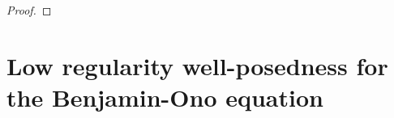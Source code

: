 \documentclass{amsart}
\theoremstyle{definition}
\begin{document}
\begin{proof}
%
%

\end{proof}

\section{Low regularity well-posedness for the Benjamin-Ono equation}
\label{section:BenjaminOno}
\end{document}
